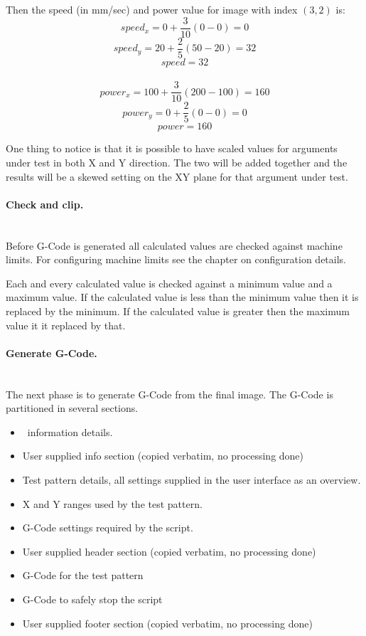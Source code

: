 Then the speed (in mm/sec) and power value for image with index $(3, 2)$ is:
\[ speed_{x} = 0 + \frac{3}{10}(0 - 0) = 0 \]
\[ speed_{y} = 20 + \frac{2}{5}(50 - 20) = 32 \]
\[ speed = 32 \]
~\\
\[ power_{x} = 100 + \frac{3}{10}(200 - 100) = 160\]
\[ power_{y} = 0 + \frac{2}{5}(0 - 0) = 0\]
\[ power = 160 \]

One thing to notice is that it is possible to have scaled values for arguments under test in both X and
Y direction. The two will be added together and the results will be a skewed setting on the XY plane for that
argument under test.

\paragraph{Check and clip.}~\\
Before G-Code is generated all calculated values are checked against machine limits.
For configuring machine limits see the chapter on configuration details.

Each and every calculated value is checked against a minimum value and a maximum value.
If the calculated value is less than the minimum value then it is replaced by the minimum.
If the calculated value is greater then the maximum value it it replaced by that.


\paragraph{Generate G-Code.}~\\
The next phase is to generate G-Code from the final image. The G-Code is partitioned in several sections.
\begin{itemize}
    \item \GS\ information details.
    \item User supplied info section (copied verbatim, no processing done)
    \item Test pattern details, all settings supplied in the user interface as an overview.
    \item X and Y ranges used by the test pattern.
    \item G-Code settings required by the script.
    \item User supplied header section (copied verbatim, no processing done)
    \item G-Code for the test pattern
    \item G-Code to safely stop the script
    \item User supplied footer section (copied verbatim, no processing done)
\end{itemize}

